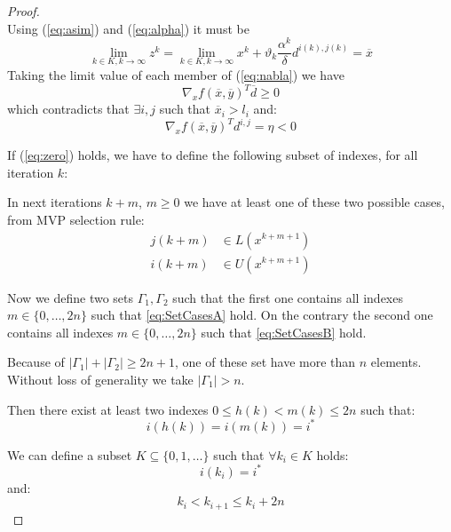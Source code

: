 \begin{proof}
\begin{equation}
\end{equation}
Using (\ref{eq:asim}) and (\ref{eq:alpha}) it must be
\begin{equation}
\lim_{k \in K, k \rightarrow \infty} z^k = \lim_{k \in K, k \rightarrow \infty} x^k + \vartheta_k \frac{\alpha^k}{\delta} d^{i(k),j(k)} = \overline{x}
\end{equation}
Taking the limit value of each member of (\ref{eq:nabla}) we have
\begin{equation}
\nabla_x f(\overline{x},\overline{y})^T \overline{d} \geq 0 %
\end{equation}
which contradicts that $\exists i,j$ such that $\overline{x}_i >l_i$ and:
\begin{equation}
\nabla_x f(\overline{x},\overline{y})^T d^{i,j} =\eta <0
\end{equation}


If (\ref{eq:zero}) holds, we have to define the following subset of indexes, for all iteration $k$:

In next iterations $k+m$, $m\ge 0$ we have at least one of these two possible cases, from MVP selection rule:
\begin{subequations}
\begin{align}
 j(k+m) &\in L(x^{k+m+1})\label{eq:SetCasesA}\\
 i(k+m) &\in U(x^{k+m+1})\label{eq:SetCasesB}
\end{align}
\end{subequations}

Now we define two sets $\Gamma_1,\Gamma_2$ such that the first one contains all indexes $m \in\{0,\ldots,2n\}$ such that \ref{eq:SetCasesA} hold.
On the contrary the second one contains all indexes $m \in\{0,\ldots,2n\}$ such that \ref{eq:SetCasesB} hold.

Because of $|\Gamma_1|+|\Gamma_2|\ge2n+1$, one of these set have more than $n$ elements. Without loss of generality we take $|\Gamma_1|> n$.

Then there exist at least two indexes $0\le h(k)< m(k)\le 2n$ such that:
\begin{equation}
 i(h(k))=i(m(k))=i^*
\end{equation}

We can define a subset $K \subseteq \{0,1,\ldots\}$ such that $\forall k_i \in K$ holds:
\begin{equation}
 i(k_i)=i^*
\end{equation}
and:
\begin{equation}
 k_i <k_{i+1} \le k_i+2n
\end{equation}


\end{proof}
